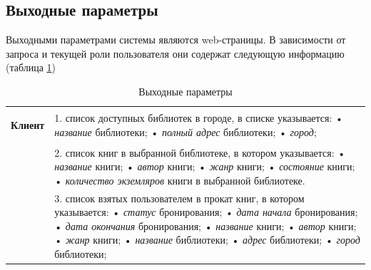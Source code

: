 \documentclass[a4paper, 12pt]{article}
\begin{document}
\begin{large}
\subsection{Выходные параметры}
Выходными параметрами системы являются web-страницы. 
В зависимости от запроса и текущей роли пользователя они содержат следующую информацию (таблица \ref{tbl:output-data})

\begin{longtable}{|p{0.5cm}|p{15.5cm}|}
	\caption{Выходные параметры}
	\label{tbl:output-data} \\
	\hline
	
	\begin{rotatebox}[origin=r]{90}
		{ \textbf{Клиент}}
	\end{rotatebox} 
	& 
	1. список доступных библиотек в городе, в списке указывается: \newline
	• \textit{название} библиотеки; \newline
	• \textit{полный адрес} библиотеки; \newline
	• \textit{город}; \\
	\cline{2-2}
	
	&
	2. список книг в выбранной библиотеке, в котором указывается: \newline
	• \textit{название} книги; \newline
    • \textit{автор} книги; \newline
    • \textit{жанр} книги; \newline
    • \textit{состояние} книги; \newline
    • \textit{количество экземляров} книги в выбранной библиотеке.
	\\
	\cline{2-2}
	
	&
	3. список взятых пользователем в прокат книг, в котором указывается: \newline
	• \textit{статус} бронирования; \newline
	• \textit{дата начала} бронирования; \newline
	• \textit{дата окончания} бронирования; \newline
	• \textit{название} книги; \newline
	• \textit{автор} книги; \newline
	• \textit{жанр} книги; \newline
	• \textit{название} библиотеки; \newline
	• \textit{адрес} библиотеки; \newline
	• \textit{город} библиотеки; \\
	\cline{2-2}
	

\end{longtable}
\end{large}
\end{document}
